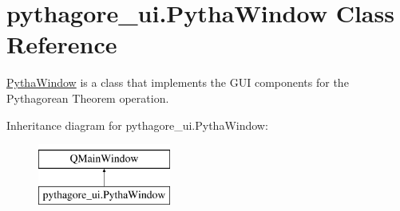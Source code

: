 \hypertarget{classpythagore__ui_1_1_pytha_window}{}\section{pythagore\+\_\+ui.\+Pytha\+Window Class Reference}
\label{classpythagore__ui_1_1_pytha_window}


\hyperlink{classpythagore__ui_1_1_pytha_window}{Pytha\+Window} is a class that implements the G\+UI components for the Pythagorean Theorem operation.  


Inheritance diagram for pythagore\+\_\+ui.\+Pytha\+Window\+:\begin{figure}[H]
\begin{center}
\leavevmode
\includegraphics[height=2.000000cm]{classpythagore__ui_1_1_pytha_window}
\end{center}
\end{figure}
